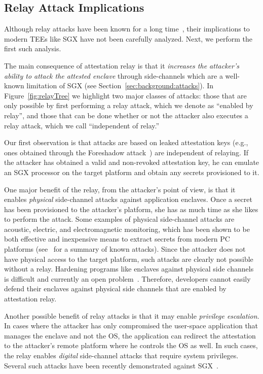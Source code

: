             
\subsection{Relay Attack Implications}
\label{sec:problemStatement:implication}

Although relay attacks have been known for a long time~\cite{parno2008bootstrapping}, their implications to modern TEEs like SGX have not been carefully analyzed. Next, we perform the first such analysis.

The main consequence of attestation relay is that it \emph{increases the attacker's ability to attack the attested enclave} through side-channels which are a well-known limitation of SGX (see Section~\ref{sec:background:attacks}). In Figure~\ref{fig:relayTree} we highlight two major classes of attacks: those that are only possible by first performing a relay attack, which we denote as ``enabled by relay'', and those that can be done whether or not the attacker also executes a relay attack, which we call ``independent of relay.''


 Our first observation is that attacks are based on leaked attestation keys (e.g., ones obtained through the Foreshadow attack~\cite{foreshadow-usenix18}) are independent of relaying. If the attacker has obtained a valid and non-revoked attestation key, he can emulate an SGX processor on the target platform and obtain any secrets provisioned to it.


 One major benefit of the relay, from the attacker's point of view, is that it enables \emph{physical} side-channel attacks against application enclaves. Once a secret has been provisioned to the attacker's platform, she has as much time as she likes to perform the attack. Some examples of physical side-channel attacks are acoustic, electric, and electromagnetic monitoring, which has been shown to be both effective and inexpensive means to extract secrets from modern PC platforms (see~\cite{genkin2016physical} for a summary of known attacks). Since the attacker does not have physical access to the target platform, such attacks are clearly not possible without a relay. Hardening programs like enclaves against physical side channels is difficult and currently an open problem~\cite{genkin2016physical}. Therefore, developers cannot easily defend their enclaves against physical side channels that are enabled by attestation relay.


Another possible benefit of relay attacks is that it may enable \emph{privilege escalation}. In cases where the attacker has only compromised the user-space application that manages the enclave and not the OS, the application can redirect the attestation to the attacker's remote platform where he controls the OS as well. In such cases, the relay enables \emph{digital} side-channel attacks that require system privileges. Several such attacks have been recently demonstrated against SGX~\cite{moghimi2017cachezoom, brasser2017software, gotzfried2017cache}.


